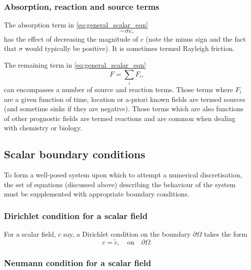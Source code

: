 \subsubsection{Absorption, reaction and source terms}\label{sec:MP-AdvdifEqn-abs}

The absorption term in \eqref{eq:general_scalar_eqn} 
\begin{equation}\label{eq:scalar_absorption}
-\sigma c,
\end{equation}
has the effect of decreasing the magnitude of $c$ (note the minus sign and the fact 
that $\sigma$ would typically be positive). It is sometimes termed Rayleigh friction. 

The remaining term in \eqref{eq:general_scalar_eqn}
\begin{equation}\label{eq:scalar_source}
F = \sum_i F_i,
\end{equation}
can encompasses a number of source and reaction terms. Those terms where $F_i$ are
a given function of time, location or a-priori known fields are termed sources (and sometime
sinks if they are negative). Those terms which are also functions of other prognostic fields
are termed reactions and are common when dealing with chemistry or biology.

\subsection{Scalar boundary conditions} \label{sec:BCs}


To form a well-posed system upon which to attempt a numerical discretisation, the
set of equations (discussed above) describing the behaviour of the 
system must be supplemented with appropriate boundary conditions.


\subsubsection{Dirichlet condition for a scalar field}\label{sec:bc_scalar_dirichlet}
For a scalar field, $c$ say, a Dirichlet condition on the boundary
$\partial\Omega$ takes the form
\begin{equation*}
c=\tilde{c},\quad \textrm{on}\quad \partial\Omega.
\end{equation*}


\subsubsection{Neumann condition for a scalar field}\label{sec:bc_scalar_neumann}

